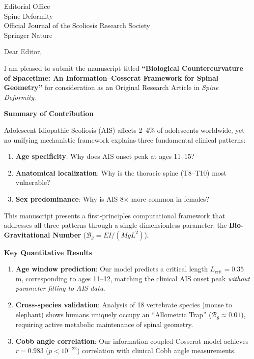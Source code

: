 \documentclass[11pt,a4paper]{letter}
\begin{document}
\begin{letter}{Editorial Office\\
Spine Deformity\\
Official Journal of the Scoliosis Research Society\\
Springer Nature}

\opening{Dear Editor,}

I am pleased to submit the manuscript titled \textbf{``Biological Countercurvature of Spacetime: An Information--Cosserat Framework for Spinal Geometry''} for consideration as an Original Research Article in \textit{Spine Deformity}.

\textbf{Summary of Contribution}

Adolescent Idiopathic Scoliosis (AIS) affects 2--4\% of adolescents worldwide, yet no unifying mechanistic framework explains three fundamental clinical patterns:

\begin{enumerate}
\item \textbf{Age specificity}: Why does AIS onset peak at ages 11--15?
\item \textbf{Anatomical localization}: Why is the thoracic spine (T8--T10) most vulnerable?
\item \textbf{Sex predominance}: Why is AIS 8$\times$ more common in females?
\end{enumerate}

This manuscript presents a first-principles computational framework that addresses all three patterns through a single dimensionless parameter: the \textbf{Bio-Gravitational Number} ($\mathcal{B}_g = EI/(MgL^2)$).

\textbf{Key Quantitative Results}

\begin{enumerate}
\item \textbf{Age window prediction}: Our model predicts a critical length $L_{\text{crit}} = 0.35$\,m, corresponding to ages 11--12, matching the clinical AIS onset peak \textit{without parameter fitting to AIS data}.

\item \textbf{Cross-species validation}: Analysis of 18 vertebrate species (mouse to elephant) shows humans uniquely occupy an ``Allometric Trap'' ($\mathcal{B}_g \approx 0.01$), requiring active metabolic maintenance of spinal geometry.

\item \textbf{Cobb angle correlation}: Our information-coupled Cosserat model achieves $r = 0.983$ ($p < 10^{-22}$) correlation with clinical Cobb angle measurements.


\end{enumerate}
\end{letter}
\end{document}
